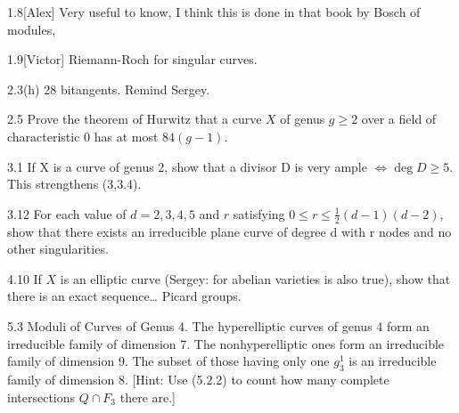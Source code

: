 \begin{manualexercise}{1.8}[Alex]
	Very useful to know, I think this is done in that book by Bosch of modules,
\end{manualexercise}

\begin{manualexercise}{1.9}[Victor]
	Riemann-Roch for singular curves.
\end{manualexercise}

\begin{manualexercise}{2.3(h)}
	28 bitangents. Remind Sergey.
\end{manualexercise}

\begin{manualexercise}{2.5}
	Prove the theorem of Hurwitz that a curve $X$ of genus $g\geq 2$ over a field of characteristic 0 has at most $84(g-1)$.
\end{manualexercise}

\begin{manualexercise}{3.1}
	If X is a curve of genus 2, show that a divisor D is very ample $\iff \operatorname{deg} D \geq 5$.  This strengthens (3,3.4).
\end{manualexercise}

\begin{manualexercise}{3.12}
	For each value of $d = 2,3,4,5$ and $r$ satisfying $0\leq r\leq \frac{1}{2}(d-1)(d-2)$, show  that there exists an irreducible plane curve of degree d with r nodes and no other  singularities.
\end{manualexercise}

\begin{manualexercise}{4.10}
	If $X$ is an elliptic curve (Sergey: for abelian varieties is also true), show that there is an exact sequence… Picard groups.
\end{manualexercise}

\begin{manualexercise}{5.3}
	Moduli of Curves of Genus 4. The hyperelliptic curves of genus 4 form an irreducible family of dimension 7. The nonhyperelliptic ones form an irreducible  family of dimension 9. The subset of those having only one $g_3^{1}$ is an irreducible  family of dimension 8. [Hint: Use (5.2.2) to count how many complete intersections $Q\cap F_3$ there are.]  
\end{manualexercise}

